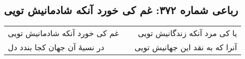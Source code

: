 \begin{center}
\section*{رباعی شماره ۳۷۲: غم کی خورد آنکه شادمانیش تویی}
\label{sec:sh372}
\begin{longtable}{l p{0.5cm} r}
غم کی خورد آنکه شادمانیش تویی
&&
یا کی مرد آنکه زندگانیش تویی
\\
در نسیهٔ آن جهان کجا بندد دل
&&
آنرا که به نقد این جهانیش تویی
\\
\end{longtable}
\end{center}
